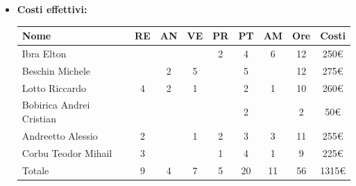 \begin{itemize}
\begin{longtable}{|c|c|c|c|}
        \hline
        \end{longtable}
    \item \textbf{Costi effettivi:}
    \begin{longtable}{|p{}|c|c|c|c|c|c|c|c|}
        \hline
        Nome & RE & AN & VE & PR & PT & AM & Ore & Costi\\
        \hline
        Ibra \newline Elton & & & &2 &4 &6 &12 &250€ \\
        \hline
        Beschin Michele & & 2& 5& & 5& & 12& 275€\\
        \hline
        Lotto \newline Riccardo & 4& 2& 1& & 2& 1& 10& 260€\\
        \hline
        Bobirica Andrei Cristian & & & & &2 & &2 &50€ \\
        \hline
        Andreetto Alessio & 2& & 1& 2& 3& 3& 11& 255€\\
        \hline
        Corbu Teodor Mihail & 3& & & 1& 4& 1& 9& 225€\\
        \hline
        Totale &9 &4 &7 &5 &20 &11 &56 &1315€ \\
        \hline
    \end{longtable}
    \end{itemize}

